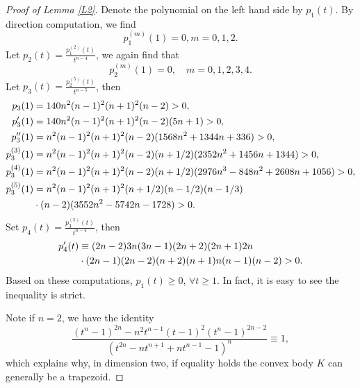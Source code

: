 \documentclass[12pt]{amsart}
\numberwithin{equation}{section}
\numberwithin{lemma}{section}
\numberwithin{proposition}{section}
\numberwithin{corollary}{section}
\numberwithin{remark}{section}
\begin{document}
\begin{proof}[Proof of Lemma \ref{L2}]
Denote the polynomial on the left hand side by $p_1(t)$.  By direction computation, we find 
\[
p_1^{(m)}(1)=0, m=0,1,2.
\]
Let $p_2(t)=\frac{p_1^{(2)}(t)}{t^{n-4}}$, we again find that 
\[
p_2^{(m)}(1)=0, \quad m=0, 1, 2, 3, 4. 
\]
Let $p_3(t)=\frac{p_2^{(5)}(t)}{t^{n-5}}$, then 
\begin{align} \notag 
p_3(1)&=140n^2 (n-1)^2 (n+1)^2 (n-2)>0, \\ \notag
p_3'(1)&=140n^2 (n-1)^2 (n+1)^2 (n-2)(5n+1)>0, \\ \notag
p_3''(1)&=n^2 (n-1)^2 (n+1)^2 (n-2)(1568n^2+1344n+336)>0, \\ \notag
p_3^{(3)}(1)&=n^2 (n-1)^2 (n+1)^2 (n-2)(n+1/2)(2352n^2+1456n+1344)>0, \\ \notag
p_3^{(4)}(1)&=n^2 (n-1)^2 (n+1)^2 (n-2)(n+1/2)(2976n^3-848n^2+2608n+1056)>0, \\ \notag
p_3^{(5)}(1)&=n^2 (n-1)^2 (n+1)^2 (n+1/2)(n-1/2)(n-1/3) \\ \notag
& \cdot (n-2)(3552n^2-5742n-1728)>0.
\end{align}
Set $p_4(t)=\frac{p_3^{(5)}(t)}{t^{n-4}}$, then 
\begin{align} \notag 
p_4'(t)&\equiv (2n-2)3n(3n-1)(2n+2)(2n+1)2n\\ \notag
 &\cdot (2n-1)(2n-2)(n+2)(n+1)n(n-1)(n-2)>0.
\end{align}
Based on these computations, $p_1(t)\geq 0$, $\forall t\geq 1$. In fact, it is easy to see the inequality is strict. 

Note if $n=2$, we have the identity
\[
\frac{\left(t^n-1\right)^{2 n}-n^2 t^{n-1}(t-1)^2\left(t^n-1\right)^{2 n-2}}{\left(t^{2 n}-n t^{n+1}+n t^{n-1}-1\right)^n} \equiv  1,
\]
which explains why, in dimension two, if equality holds the convex body $K$ can generally be a trapezoid.
\end{proof}



\end{document}

